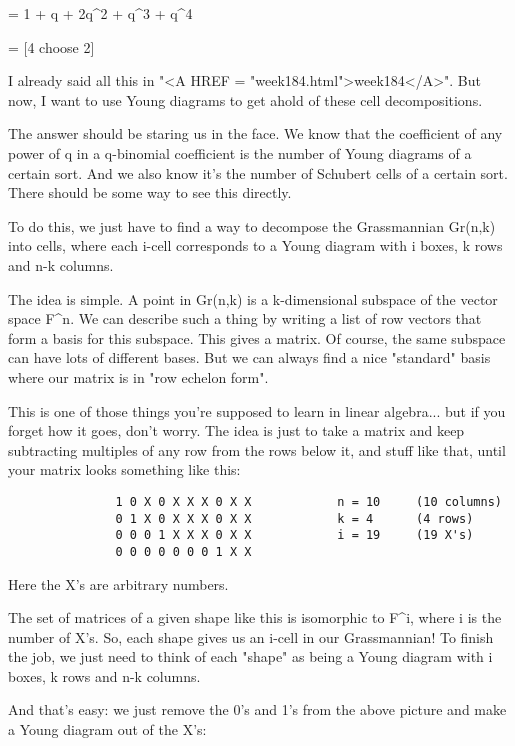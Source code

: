           =  1  +  q  +  2q^{2}  +  q^{3}  +  q^{4}
 
          = [4 choose 2]
$$
    
I already said all this in "<A HREF =
"week184.html">week184</A>".  But now, I want to use Young diagrams
to get ahold of these cell decompositions.

The answer should be staring us in the face.  We know that the
coefficient of any power of q in a q-binomial coefficient is the number
of Young diagrams of a certain sort.  And we also know it's the number of
Schubert cells of a certain sort.  There should be some way to see this
directly.

To do this, we just have to find a way to decompose the Grassmannian Gr(n,k)
into cells, where each i-cell corresponds to a Young diagram with i boxes, 
k rows and n-k columns.

The idea is simple.  A point in Gr(n,k) is a k-dimensional subspace of
the vector space F^{n}.  
We can describe such a thing by writing a list of
row vectors that form a basis for this subspace.  This gives a matrix.
Of course, the same subspace can have lots of different bases.  But we
can always find a nice "standard" basis where our matrix is in
"row echelon form".

This is one of those things you're supposed to learn in linear algebra... 
but if you forget how it goes, don't worry.  The idea is just to take a
matrix and keep subtracting multiples of any row from the rows below it,
and stuff like that, until your matrix looks something like this:
               
\begin{verbatim}
               1 0 X 0 X X X 0 X X            n = 10     (10 columns)
               0 1 X 0 X X X 0 X X            k = 4      (4 rows)
               0 0 0 1 X X X 0 X X            i = 19     (19 X's)
               0 0 0 0 0 0 0 1 X X
\end{verbatim}
    
Here the X's are arbitrary numbers.  


The set of matrices of a given shape like this is isomorphic to
F^{i}, where i is the number of X's.  So, each shape gives us an
i-cell in our Grassmannian!  To finish the job, we just need to think of
each "shape" as being a Young diagram with i boxes, k rows and
n-k columns.

And that's easy: we just remove the 0's and 1's from the above picture
and make a Young diagram out of the X's:
               
